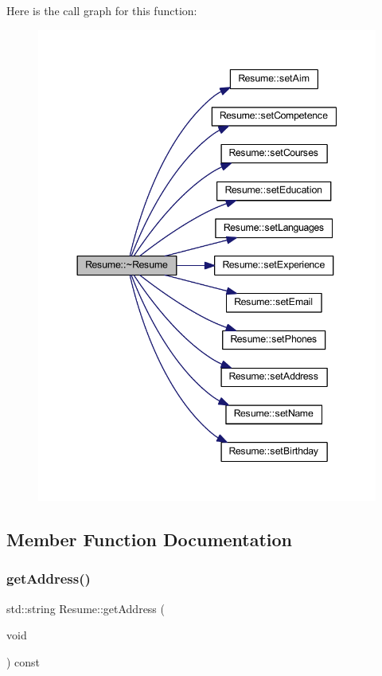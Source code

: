 Here is the call graph for this function\+:
\nopagebreak
\begin{figure}[H]
\begin{center}
\leavevmode
\includegraphics[width=344pt]{class_resume_a86b302420dc26041de719f14ce6e6621_cgraph}
\end{center}
\end{figure}


\subsection{Member Function Documentation}
\hypertarget{class_resume_af11a5f3bfadd89987d4603190647a89d}{}\label{class_resume_af11a5f3bfadd89987d4603190647a89d} 
\subsubsection{\texorpdfstring{get\+Address()}{getAddress()}}
{\footnotesize\ttfamily std\+::string Resume\+::get\+Address (\begin{DoxyParamCaption}\item[{void}]{ }\end{DoxyParamCaption}) const\hspace{0.3cm}{\ttfamily [inline]}}

